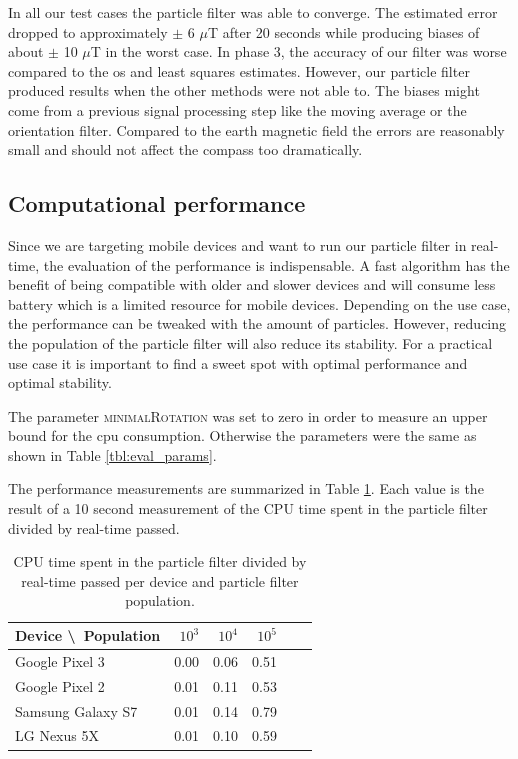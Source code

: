 In all our test cases the particle filter was able to converge. The estimated error dropped to approximately $\pm$ 6 $\mu$T after 20 seconds while producing biases of about $\pm$ 10 $\mu$T in the worst case. In phase 3, the accuracy of our filter was worse compared to the \gls{os} and least squares estimates. However, our particle filter produced results when the other methods were not able to. The biases might come from a previous signal processing step like the moving average or the orientation filter. Compared to the earth magnetic field the errors are reasonably small and should not affect the compass too dramatically.

\subsection{Computational performance}

Since we are targeting mobile devices and want to run our particle filter in real-time, the evaluation of the performance is indispensable. A fast algorithm has the benefit of being compatible with older and slower devices and will consume less battery which is a limited resource for mobile devices. Depending on the use case, the performance can be tweaked with the amount of particles. However, reducing the population of the particle filter will also reduce its stability. For a practical use case it is important to find a sweet spot with optimal performance and optimal stability.

The parameter \textsc{minimalRotation} was set to zero in order to measure an upper bound for the \gls{cpu} consumption. Otherwise the parameters were the same as shown in Table \ref{tbl:eval_params}.

The performance measurements are summarized in Table \ref{tbl:eval_performance}. Each value is the result of a 10 second measurement of the CPU time spent in the particle filter divided by real-time passed.

\begin{table}[h]
    \centering
    \begin{tabular}{ | l | r | r | r | r | r | }
    \hline
    \textbf{Device \textbackslash \ Population} & $10^3$ & $10^4$ & $10^5$ \\ \hline
    Google Pixel 3    & 0.00 & 0.06 & 0.51 \\ \hline
    Google Pixel 2    & 0.01 & 0.11 & 0.53  \\ \hline
    Samsung Galaxy S7 & 0.01 & 0.14 & 0.79  \\ \hline
    LG Nexus 5X       & 0.01 & 0.10 & 0.59  \\ \hline
    \end{tabular}
    \caption{CPU time spent in the particle filter divided by real-time passed per device and particle filter population.}
    \label{tbl:eval_performance}
\end{table}
